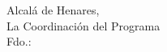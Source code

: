 \documentclass[10pt,a4paper,oneside]{article}
\providecommand{\myAcademicCommissionCoordinator}{}
\begin{document}
\vfill
\begin{flushright}
Alcalá de Henares, \PhDUnderline{5.5cm}{\myPaperworkDate}\\[0.40cm]
La Coordinación del Programa\\[1.40cm]
Fdo.: \PhDUnderline{6.5cm}{\myAcademicCommissionCoordinator}
\end{flushright}
\end{document}
